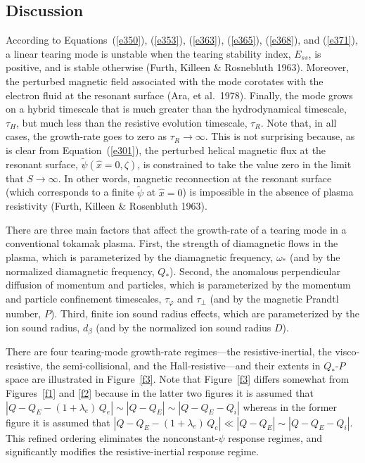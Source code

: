 \documentclass[notitlepage,12pt]{article}
\begin{document}
\subsection{Discussion}
According to Equations~(\ref{e350}), (\ref{e353}), (\ref{e363}), (\ref{e365}), (\ref{e368}), and (\ref{e371}), a linear tearing mode is unstable when the tearing stability index, $E_{ss}$, is positive, and is stable otherwise (Furth, Killeen \& Rosnebluth 1963).
Moreover, the perturbed magnetic field associated with the mode corotates with the electron fluid at the resonant surface (Ara, et al.\ 1978). Finally,
the mode grows on a hybrid timescale that is much greater than the hydrodynamical timescale, $\tau_H$,
but much less than the resistive evolution timescale, $\tau_R$. Note that, in all cases, the growth-rate goes to zero as
$\tau_R\rightarrow \infty$. This is not surprising because, as is clear from Equation~(\ref{e301}), the perturbed
helical magnetic flux at the resonant surface,  $\tilde{\psi}(\hat{x}=0,\zeta)$, is constrained to take the value zero
in the limit that $S\rightarrow\infty$. In other words, magnetic reconnection at the resonant surface (which corresponds to a finite
$\tilde{\psi}$ at $\hat{x}=0$) is impossible in the absence of plasma resistivity (Furth, Killeen \& Rosenbluth 1963). 

There are three main factors that
affect the growth-rate of a tearing mode in a conventional tokamak plasma. First, the strength of diamagnetic flows in the plasma, which is parameterized by the
diamagnetic frequency, $\omega_\ast$ (and by the normalized diamagnetic frequency, $Q_\ast$). Second, the  anomalous perpendicular diffusion of momentum and particles, which is parameterized by the momentum and particle confinement
timescales, $\tau_\varphi$ and $\tau_\perp$ (and by the magnetic Prandtl number, $P$). Third, finite ion sound radius effects,  which are parameterized by the ion sound radius, $d_\beta$ (and by the normalized ion 
sound radius $D$).

 There are four tearing-mode growth-rate regimes---the resistive-inertial, the visco-resistive, the semi-collisional, and the Hall-resistive---and their extents in $Q_\ast$-$P$ space are illustrated in Figure~\ref{f3}.
Note that Figure~\ref{f3} differs somewhat from Figures~\ref{f1} and \ref{f2} because in the latter two
figures it is assumed that $|Q-Q_E-(1+\lambda_e)\,Q_e|\sim |Q-Q_E|\sim |Q-Q_E-Q_i|$ whereas
in the former figure it is assumed that $|Q-Q_E-(1+\lambda_e)\,Q_e|\ll |Q-Q_E|\sim |Q-Q_E-Q_i|$.
This refined ordering eliminates the nonconstant-$\psi$ response regimes, and significantly modifies the
resistive-inertial response regime. 
\end{document}
